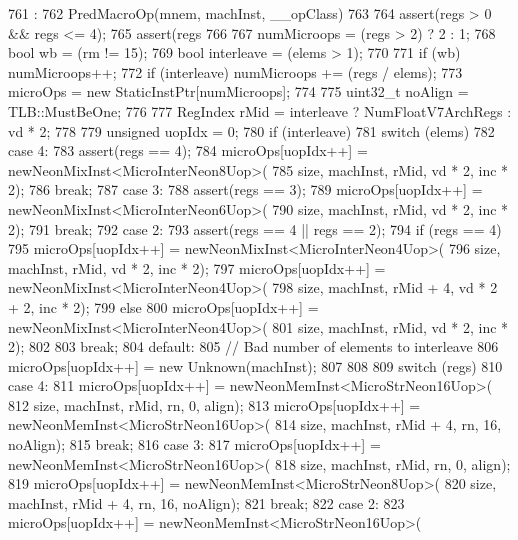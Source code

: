 \begin{DoxyCode}
761                                                                                :
762     PredMacroOp(mnem, machInst, __opClass)
763 {
764     assert(regs > 0 && regs <= 4);
765     assert(regs %
766 
767     numMicroops = (regs > 2) ? 2 : 1;
768     bool wb = (rm != 15);
769     bool interleave = (elems > 1);
770 
771     if (wb) numMicroops++;
772     if (interleave) numMicroops += (regs / elems);
773     microOps = new StaticInstPtr[numMicroops];
774 
775     uint32_t noAlign = TLB::MustBeOne;
776 
777     RegIndex rMid = interleave ? NumFloatV7ArchRegs : vd * 2;
778 
779     unsigned uopIdx = 0;
780     if (interleave) {
781         switch (elems) {
782           case 4:
783             assert(regs == 4);
784             microOps[uopIdx++] = newNeonMixInst<MicroInterNeon8Uop>(
785                     size, machInst, rMid, vd * 2, inc * 2);
786             break;
787           case 3:
788             assert(regs == 3);
789             microOps[uopIdx++] = newNeonMixInst<MicroInterNeon6Uop>(
790                     size, machInst, rMid, vd * 2, inc * 2);
791             break;
792           case 2:
793             assert(regs == 4 || regs == 2);
794             if (regs == 4) {
795                 microOps[uopIdx++] = newNeonMixInst<MicroInterNeon4Uop>(
796                         size, machInst, rMid, vd * 2, inc * 2);
797                 microOps[uopIdx++] = newNeonMixInst<MicroInterNeon4Uop>(
798                         size, machInst, rMid + 4, vd * 2 + 2, inc * 2);
799             } else {
800                 microOps[uopIdx++] = newNeonMixInst<MicroInterNeon4Uop>(
801                         size, machInst, rMid, vd * 2, inc * 2);
802             }
803             break;
804           default:
805             // Bad number of elements to interleave
806             microOps[uopIdx++] = new Unknown(machInst);
807         }
808     }
809     switch (regs) {
810       case 4:
811         microOps[uopIdx++] = newNeonMemInst<MicroStrNeon16Uop>(
812                 size, machInst, rMid, rn, 0, align);
813         microOps[uopIdx++] = newNeonMemInst<MicroStrNeon16Uop>(
814                 size, machInst, rMid + 4, rn, 16, noAlign);
815         break;
816       case 3:
817         microOps[uopIdx++] = newNeonMemInst<MicroStrNeon16Uop>(
818                 size, machInst, rMid, rn, 0, align);
819         microOps[uopIdx++] = newNeonMemInst<MicroStrNeon8Uop>(
820                 size, machInst, rMid + 4, rn, 16, noAlign);
821         break;
822       case 2:
823         microOps[uopIdx++] = newNeonMemInst<MicroStrNeon16Uop>(
}}
\end{DoxyCode}
